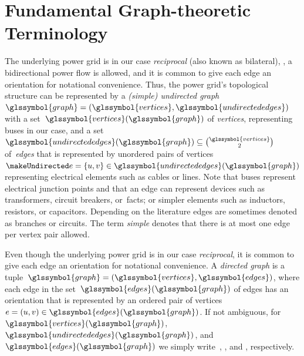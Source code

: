 \section{Fundamental Graph-theoretic Terminology}
\label{ch:foundations:sec:graph-theory}
% 
The underlying power grid is in our case \emph{reciprocal} (also known
as bilateral), \ie, a bidirectional power flow is allowed, and it is common to
give each edge an orientation for notational convenience. Thus, 
the power grid's topological structure can be represented by a
\emph{(simple) undirected graph}~$\glssymbol{graph} =
(\glssymbol{vertices},\glssymbol{undirectededges})$ with a
set~$\glssymbol{vertices}(\glssymbol{graph})$ of \emph{vertices}, representing
buses in our case, and a
set~$\glssymbol{undirectededges}(\glssymbol{graph})\subseteq\binom{\glssymbol{vertices}}{2}$
of~\emph{edges} that is represented by unordered pairs of
vertices~$\undirectededge =
\{\vertexa,\vertexb\}\in\glssymbol{undirectededges}(\glssymbol{graph})$
representing electrical elements such as cables or lines. Note that buses
represent electrical junction points and that an edge can represent devices such
as transformers, circuit breakers, or~\gls{facts}; or simpler elements such as
inductors, resistors, or capacitors. Depending on the literature edges are
sometimes denoted as branches or circuits. The term \emph{simple} denotes that
there is at most one edge per vertex pair allowed.

Even though the underlying power grid is in our case \emph{reciprocal}, it is
common to give each edge an orientation for notational convenience. A
\emph{directed graph} is a tuple~$
  \glssymbol{graph} 
  = (\glssymbol{vertices},\glssymbol{edges})
$, where each edge in the set~$\glssymbol{edges}(\glssymbol{graph})$ of edges
has an orientation that is represented by an ordered pair of vertices~$
  \edge 
  =
  (\vertexa,\vertexb)
  \in
  \glssymbol{edges}(\glssymbol{graph})
$. If not ambiguous, for~$\glssymbol{vertices}(\glssymbol{graph})$,
$\glssymbol{undirectededges}(\glssymbol{graph})$, and
$\glssymbol{edges}(\glssymbol{graph})$ we simply write~,
, and , respectively.

